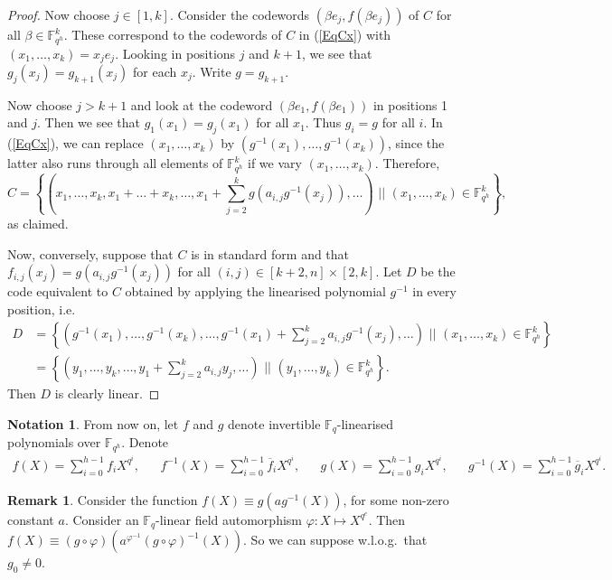\documentclass[a4paper]{article}
\theoremstyle{definition}
\newtheorem{rmk}[thm]{Remark}
\newtheorem{nt}[thm]{Notation}
\newcommand{\FF}{\mathbb F}
\newcommand{\sett}[2]{ \left\{ #1 \, \, || \, \, #2 \right \} }
\begin{document}
\begin{proof}
Now choose $j \in [1,k]$.
Consider the codewords $(\beta e_j, f(\beta e_j))$ of $C$ for all $\beta \in \FF_{q^h}^k$.
These correspond to the codewords of $C$ in (\ref{EqCx}) with $(x_1, \dots, x_k) = x_j e_j$.
Looking in positions $j$ and $k+1$, we see that $g_j(x_j) = g_{k+1}(x_j)$ for each $x_j$.
Write $g = g_{k+1}$.

Now choose \( j > k+1 \) and look at the codeword \( (\beta e_1, f(\beta e_1)) \) in positions 1 and $j$.
Then we see that $g_1(x_1) = g_j(x_1)$ for all $x_1$.
Thus $g_i = g$ for all $i$.
In (\ref{EqCx}), we can replace $(x_1, \dots, x_k)$ by $(g^{-1}(x_1), \dots, g^{-1}(x_k))$, since the latter also runs through all elements of $\FF_{q^h}^k$ if we vary $(x_1, \dots, x_k)$.
Therefore,
\[
 C = \sett{\left( x_1, \dots, x_k, x_1 + \dots + x_k, \dots, x_1 + \sum_{j=2}^k g(a_{i,j} g^{-1}(x_j)), \dots \right)}{ (x_1, \dots, x_k) \in \FF_{q^h}^k},
\]
as claimed.

Now, conversely, suppose that $C$ is in standard form and that $f_{i,j}(x_j) = g(a_{i,j} g^{-1}(x_j))$ for all $(i,j) \in [k+2,n] \times [2,k]$.
Let $D$ be the code equivalent to $C$ obtained by applying the linearised polynomial $g^{-1}$ in every position, i.e.\
\begin{align*}
 D & = \sett{ \left( g^{-1}(x_1), \dots, g^{-1}(x_k), \dots, g^{-1}(x_1) + \sum_{j=2}^k a_{i,j} g^{-1}(x_j), \dots \right) }{(x_1,\dots,x_k) \in \FF_{q^h}^k} \\
 & = \sett{ \left( y_1, \dots, y_k, \dots, y_1 + \sum_{j=2}^k a_{i,j} y_j, \dots \right) }{(y_1,\dots,y_k) \in \FF_{q^h}^k}.
\end{align*}
Then $D$ is clearly linear.
\end{proof}

\begin{nt}
From now on, let $f$ and $g$ denote invertible $\FF_{q}$-linearised polynomials over $\FF_{q^h}$.
Denote
\begin{align*}
 f(X) = \sum_{i=0}^{h-1} f_i X^{q^i}, &&
 f^{-1}(X) = \sum_{i=0}^{h-1} \overline f_i X^{q^i}, &&
 g(X) = \sum_{i=0}^{h-1} g_i X^{q^i}, &&
 g^{-1}(X) = \sum_{i=0}^{h-1} \overline g_i X^{q^i}.
\end{align*}
\end{nt}

\begin{rmk}
 \label{RmkLinCoeff}
 Consider the function \( f(X) \equiv g( a g^{-1}(X)) \), for some non-zero constant $a$.
 Consider an $\FF_q$-linear field automorphism $\varphi: X \mapsto X^{q^e}$.
 Then
 \( f(X) \equiv (g \circ \varphi) ( a^{\varphi^{-1}} (g \circ \varphi)^{-1}(X)) \).
 So we can suppose w.l.o.g.\ that $g_0 \neq 0$.
\end{rmk}
\end{document}

